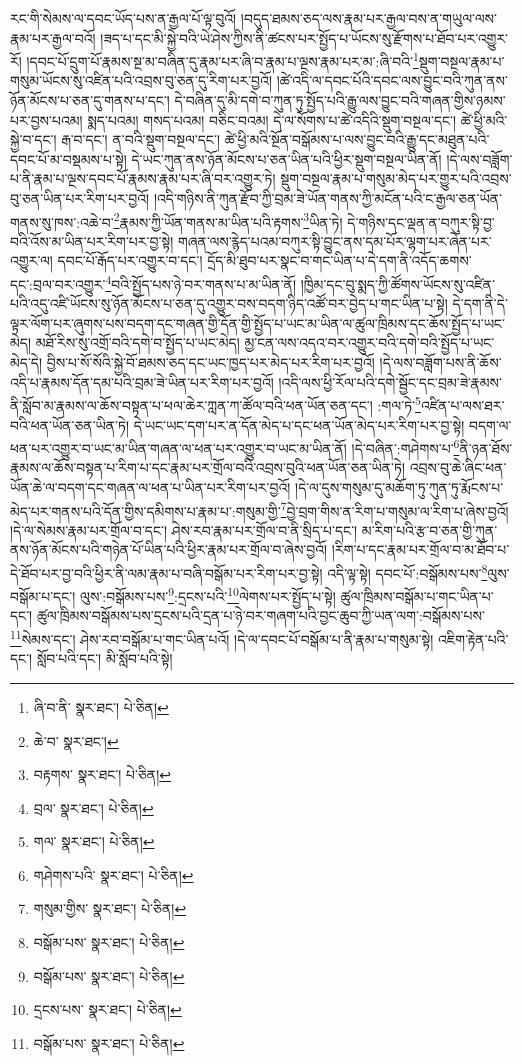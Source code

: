 རང་གི་སེམས་ལ་དབང་ཡོད་པས་ན་རྒྱལ་པོ་ལྟ་བུའོ། །བདུད་ཐམས་ཅད་ལས་རྣམ་པར་རྒྱལ་བས་ན་གཡུལ་ལས་རྣམ་པར་རྒྱལ་བའོ། །ཟད་པ་དང་མི་སྐྱེ་བའི་ཡེ་ཤེས་ཀྱིས་ནི་ཚངས་པར་སྤྱོད་པ་ཡོངས་སུ་རྫོགས་པ་ཐོབ་པར་འགྱུར་རོ། །དབང་པོ་དྲུག་པོ་རྣམས་སྔ་མ་བཞིན་དུ་རྣམ་པར་ཞི་བ་རྣམ་པ་ལྔས་རྣམ་པར་མ་:ཞི་བའི་\footnote{ཞི་བ་ནི་  སྣར་ཐང་།  པེ་ཅིན། }སྡུག་བསྔལ་རྣམ་པ་གསུམ་ཡོངས་སུ་འཛིན་པའི་འབྲས་བུ་ཅན་དུ་རིག་པར་བྱའོ། །ཚེ་འདི་ལ་དབང་པོའི་དབང་ལས་བྱུང་བའི་ཀུན་ནས་ཉོན་མོངས་པ་ཅན་དུ་གནས་པ་དང་། དེ་བཞིན་དུ་མི་དགེ་བ་ཀུན་ཏུ་སྤྱོད་པའི་རྒྱུ་ལས་བྱུང་བའི་གཞན་གྱིས་ཉམས་པར་བྱས་པའམ། སྨད་པའམ། གསད་པའམ། བཅིང་བའམ། དེ་ལ་སོགས་པ་ཚེ་འདིའི་སྡུག་བསྔལ་དང་། ཚེ་ཕྱི་མའི་སྐྱེ་བ་དང་། རྒ་བ་དང་། ན་བའི་སྡུག་བསྔལ་དང་། ཚེ་ཕྱི་མའི་སྔོན་བསྒོམས་པ་ལས་བྱུང་བའི་རྒྱུ་དང་མཐུན་པའི་དབང་པོ་མ་བསྡམས་པ་སྟེ། དེ་ཡང་ཀུན་ནས་ཉོན་མོངས་པ་ཅན་ཡིན་པའི་ཕྱིར་སྡུག་བསྔལ་ཡིན་ནོ། །དེ་ལས་བཟློག་པ་ནི་རྣམ་པ་ལྔས་དབང་པོ་རྣམས་རྣམ་པར་ཞི་བར་འགྱུར་ཏེ། སྡུག་བསྔལ་རྣམ་པ་གསུམ་མེད་པར་གྱུར་པའི་འབྲས་བུ་ཅན་ཡིན་པར་རིག་པར་བྱའོ། །འདི་གཉིས་ནི་ཀུན་རྫོབ་ཀྱི་བྲམ་ཟེ་ཡོན་གནས་ཀྱི་མངོན་པའི་ང་རྒྱལ་ཅན་ཡོན་གནས་སུ་ཁས་:འཆེ་བ་\footnote{ཆེ་བ་  སྣར་ཐང་། }རྣམས་ཀྱི་ཡོན་གནས་མ་ཡིན་པའི་རྟགས་\footnote{བརྟགས་  སྣར་ཐང་།  པེ་ཅིན། }ཡིན་ཏེ། དེ་གཉིས་དང་ལྡན་ན་བཀུར་སྟི་བྱ་བའི་འོས་མ་ཡིན་པར་རིག་པར་བྱ་སྟེ། གཞན་ལས་རྙེད་པའམ་བཀུར་སྟི་བྱུང་ནས་དམ་པོར་ལྷག་པར་ཞེན་པར་འགྱུར་ལ། དབང་པོ་རྒོད་པར་འགྱུར་བ་དང་། དྲོད་མི་ཐུབ་པར་སྣང་བ་གང་ཡིན་པ་དེ་དག་ནི་འདོད་ཆགས་དང་:བྲལ་བར་འགྱུར་\footnote{བྲལ་  སྣར་ཐང་།  པེ་ཅིན། }བའི་སྤྱོད་པས་ཉེ་བར་གནས་པ་མ་ཡིན་ནོ། །ཁྱིམ་དང་བུ་སྨད་ཀྱི་ཚོགས་ཡོངས་སུ་འཛིན་པའི་འདུ་འཛི་ཡོངས་སུ་ཉོན་མོངས་པ་ཅན་དུ་འགྱུར་བས་བདག་ཉིད་འཚོ་བར་བྱེད་པ་གང་ཡིན་པ་སྟེ། དེ་དག་ནི་དེ་ལྟར་ལོག་པར་ཞུགས་པས་བདག་དང་གཞན་གྱི་དོན་གྱི་སྤྱོད་པ་ཡང་མ་ཡིན་ལ་ཚུལ་ཁྲིམས་དང་ཆོས་སྤྱོད་པ་ཡང་མེད། མཐོ་རིས་སུ་འགྲོ་བའི་དགེ་བ་སྤྱོད་པ་ཡང་མེད། མྱ་ངན་ལས་འདའ་བར་འགྱུར་བའི་དགེ་བའི་སྤྱོད་པ་ཡང་མེད་དེ། བྱིས་པ་སོ་སོའི་སྐྱེ་བོ་ཐམས་ཅད་དང་ཡང་ཁྱད་པར་མེད་པར་རིག་པར་བྱའོ། །དེ་ལས་བཟློག་པས་ནི་ཆོས་འདི་པ་རྣམས་དོན་དམ་པའི་བྲམ་ཟེ་ཡིན་པར་རིག་པར་བྱའོ། །འདི་ལས་ཕྱི་རོལ་པའི་དགེ་སྦྱོང་དང་བྲམ་ཟེ་རྣམས་ནི་སློབ་མ་རྣམས་ལ་ཆོས་བསྟན་པ་ཕལ་ཆེར་ཀླན་ཀ་ཚོལ་བའི་ཕན་ཡོན་ཅན་དང་། :གལ་ཏེ་\footnote{གལ་  སྣར་ཐང་།  པེ་ཅིན། }འཛིན་པ་ལས་ཐར་བའི་ཕན་ཡོན་ཅན་ཡིན་ཏེ། དེ་ཡང་ཡང་དག་པར་ན་དོན་མེད་པ་དང་ཕན་ཡོན་མེད་པར་རིག་པར་བྱ་སྟེ། བདག་ལ་ཕན་པར་འགྱུར་བ་ཡང་མ་ཡིན་གཞན་ལ་ཕན་པར་འགྱུར་བ་ཡང་མ་ཡིན་ནོ། །དེ་བཞིན་:གཤེགས་པ་\footnote{གཤེགས་པའི་  སྣར་ཐང་།  པེ་ཅིན། }ནི་ཉན་ཐོས་རྣམས་ལ་ཆོས་བསྟན་པ་རིག་པ་དང་རྣམ་པར་གྲོལ་བའི་འབྲས་བུའི་ཕན་ཡོན་ཅན་ཡིན་ཏེ། འབྲས་བུ་ཆེ་ཞིང་ཕན་ཡོན་ཆེ་ལ་བདག་དང་གཞན་ལ་ཕན་པ་ཡིན་པར་རིག་པར་བྱའོ། །དེ་ལ་དུས་གསུམ་དུ་མཆོག་ཏུ་ཀུན་ཏུ་རྨོངས་པ་མེད་པར་གནས་པའི་དོན་གྱིས་དམིགས་པ་རྣམ་པ་:གསུམ་གྱི་\footnote{གསུམ་གྱིས་  སྣར་ཐང་།  པེ་ཅིན། }བྱེ་བྲག་གིས་ན་རིག་པ་གསུམ་ལ་རིག་པ་ཞེས་བྱའོ། །དེ་ལ་སེམས་རྣམ་པར་གྲོལ་བ་དང་། ཤེས་རབ་རྣམ་པར་གྲོལ་བ་ནི་སྲིད་པ་དང་། མ་རིག་པའི་རྩ་བ་ཅན་གྱི་ཀུན་ནས་ཉོན་མོངས་པའི་གཉེན་པོ་ཡིན་པའི་ཕྱིར་རྣམ་པར་གྲོལ་བ་ཞེས་བྱའོ། །རིག་པ་དང་རྣམ་པར་གྲོལ་བ་མ་ཐོབ་པ་དེ་ཐོབ་པར་བྱ་བའི་ཕྱིར་ནི་ལམ་རྣམ་པ་བཞི་བསྒོམ་པར་རིག་པར་བྱ་སྟེ། འདི་ལྟ་སྟེ། དབང་པོ་:བསྒོམས་པས་\footnote{བསྒོམ་པས་  སྣར་ཐང་།  པེ་ཅིན། }ལུས་བསྒོམ་པ་དང་། ལུས་:བསྒོམས་པས་\footnote{བསྒོམ་པས་  སྣར་ཐང་།  པེ་ཅིན། }:དྲངས་པའི་\footnote{དྲངས་པས་  སྣར་ཐང་།  པེ་ཅིན། }ལེགས་པར་སྤྱོད་པ་སྟེ། ཚུལ་ཁྲིམས་བསྒོམ་པ་གང་ཡིན་པ་དང་། ཚུལ་ཁྲིམས་བསྒོམས་པས་དྲངས་པའི་དྲན་པ་ཉེ་བར་གཞག་པའི་བྱང་ཆུབ་ཀྱི་ཡན་ལག་:བསྒོམས་པས་\footnote{བསྒོམ་པས་  སྣར་ཐང་།  པེ་ཅིན། }སེམས་དང་། ཤེས་རབ་བསྒོམ་པ་གང་ཡིན་པའོ། །དེ་ལ་དབང་པོ་བསྒོམ་པ་ནི་རྣམ་པ་གསུམ་སྟེ། འཇིག་རྟེན་པའི་དང་། སློབ་པའི་དང་། མི་སློབ་པའི་སྟེ། 